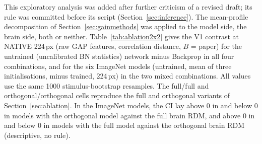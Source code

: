 This exploratory analysis was added after further criticism of a revised draft; its
rule was committed before its script (Section~\ref{sec:inference}). The mean-profile
decomposition of Section~\ref{sec:gainmethods} was applied to the model side, the brain
side, both or neither. Table~\ref{tab:ablation2x2} gives the V1 contrast at NATIVE 224\,px
(raw GAP features, correlation distance, $B$ = paper) for the untrained (uncalibrated BN
statistics) network minus Backprop in all four combinations, and for the six ImageNet models
(untrained, mean of three initialisations, minus trained, 224\,px) in the two mixed
combinations. All values use the same 1000 stimulus-bootstrap resamples. The full/full and
orthogonal/orthogonal cells reproduce the full and orthogonal variants of
Section~\ref{sec:ablation}. In the ImageNet models, the CI lay above 0 in
\AbTwoImnOrthoFullPos{} and below 0 in \AbTwoImnOrthoFullNeg{} models with the orthogonal
model against the full brain RDM, and above 0 in \AbTwoImnFullOrthoPos{} and below 0 in
\AbTwoImnFullOrthoNeg{} models with the full model against the orthogonal brain RDM
(descriptive, no rule).

